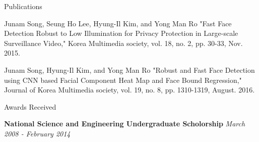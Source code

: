 \documentclass{resume}
\begin{document}
\begin{rSection}{Publications}
 \item Junam Song, Seung Ho Lee, Hyung-Il Kim, and Yong Man Ro "Fast Face Detection Robust to Low Illumination for Privacy Protection in Large-scale Surveillance Video," Korea Multimedia society, vol. 18, no. 2, pp. 30-33, Nov. 2015.
  \item Junam Song, Hyung-Il Kim, and Yong Man Ro "Robust and Fast Face Detection using CNN based Facial Component Heat Map and Face Bound Regression," Journal of Korea Multimedia society, vol. 19, no. 8, pp. 1310-1319, August. 2016.
\end{rSection}

\begin{rSection}{Awards Received}
 \item {\bf National Science and Engineering Undergraduate Scholorship} \hfill {\em March 2008 - February 2014} 
\end{rSection}
\end{document}

